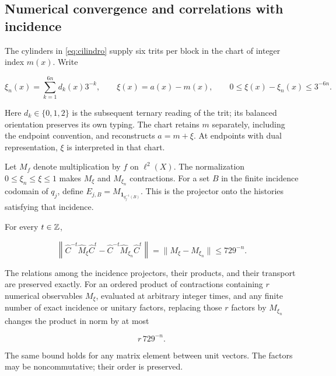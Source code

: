 \subsection{Numerical convergence and correlations with incidence}

The cylinders in \eqref{eq:cilindro} supply six trits per block in the chart of integer index \(m(x)\). Write

\[
\xi_n(x)=\sum_{k=1}^{6n}d_k(x)3^{-k},\qquad
\xi(x)=a(x)-m(x),\qquad 0\le\xi(x)-\xi_n(x)\le3^{-6n}.
\]

Here \(d_k\in\{0,1,2\}\) is the subsequent ternary reading of the trit; its balanced orientation preserves its own typing. The chart retains \(m\) separately, including the endpoint convention, and reconstructs \(a=m+\xi\). At endpoints with dual representation, \(\xi\) is interpreted in that chart.

Let \(M_f\) denote multiplication by \(f\) on \(\ell^2(X)\). The normalization \(0\le\xi_n\le\xi\le1\) makes \(M_\xi\) and \(M_{\xi_n}\) contractions. For a set \(B\) in the finite incidence codomain of \(q_j\), define \(E_{j,B}=M_{\mathbf1_{q_j^{-1}(B)}}\). This is the projector onto the histories satisfying that incidence.

\begin{theorem}
\label{nuc09:precision}
For every \(t\in\mathbb Z\),

\begin{equation}
\boxed{
\left\|\widehat C^{-t}\widehat M_\xi\widehat C^t
-\widehat C^{-t}\widehat M_{\xi_n}\widehat C^t\right\|
=\|M_\xi-M_{\xi_n}\|\le729^{-n}.}
\label{nuc09:error-observable}
\end{equation}

The relations among the incidence projectors, their products, and their transport are preserved exactly. For an ordered product of contractions containing \(r\) numerical observables \(M_\xi\), evaluated at arbitrary integer times, and any finite number of exact incidence or unitary factors, replacing those \(r\) factors by \(M_{\xi_n}\) changes the product in norm by at most

\begin{equation}
\boxed{r\,729^{-n}.}
\label{nuc09:error-producto}
\end{equation}

The same bound holds for any matrix element between unit vectors. The factors may be noncommutative; their order is preserved.
\end{theorem}

